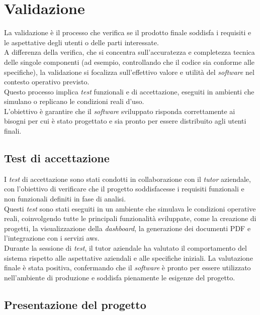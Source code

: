 \pagebreak
\section{Validazione}
\label{sez:validazione}

La validazione è il processo che verifica se il prodotto finale soddisfa i requisiti e le aspettative degli utenti o delle parti interessate. \\
A differenza della verifica, che si concentra sull’accuratezza e completezza tecnica delle singole componenti (ad esempio, controllando che il codice sia conforme alle specifiche), la validazione si focalizza sull’effettivo valore e utilità del \textit{software} nel contesto operativo previsto.  \\

\noindent Questo processo implica \textit{test} funzionali e di accettazione, eseguiti in ambienti che simulano o replicano le condizioni reali d’uso. \\
L’obiettivo è garantire che il \textit{software} sviluppato risponda correttamente ai bisogni per cui è stato progettato e sia pronto per essere distribuito agli utenti finali.


\subsection{Test di accettazione}
\label{subsec:test-accettazione}

I \textit{test} di accettazione sono stati condotti in collaborazione con il \textit{tutor} aziendale, con l’obiettivo di verificare che il progetto soddisfacesse i requisiti funzionali e non funzionali definiti in fase di analisi.\\

\noindent Questi \textit{test} sono stati eseguiti in un ambiente che simulava le condizioni operative reali, coinvolgendo tutte le principali funzionalità sviluppate, come la creazione di progetti, la visualizzazione della \textit{dashboard}, la generazione dei documenti PDF e l’integrazione con i servizi \gls{aws}.\\  

\noindent Durante la sessione di \textit{test}, il tutor aziendale ha valutato il comportamento del sistema rispetto alle aspettative aziendali e alle specifiche iniziali. La valutazione finale è stata positiva, confermando che il \textit{software} è pronto per essere utilizzato nell’ambiente di produzione e soddisfa pienamente le esigenze del progetto.
\subsection{Presentazione del progetto}
\label{subsec:presentazione-progetto}

